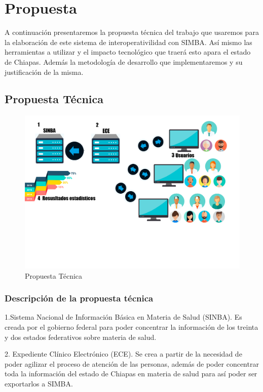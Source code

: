 \chapter{Propuesta} \label{sec:propuesta}

A continuación presentaremos la propuesta técnica del trabajo que usaremos para la elaboración de este sistema de interoperativilidad con SIMBA. Así mismo las herramientas a utilizar y el impacto tecnológico que traerá esto apara el estado de Chiapas. Además la metodología de desarrollo que implementaremos y su justificación de la misma.

\section{Propuesta Técnica}

\begin{figure}[h]
  \centering
  \includegraphics[scale=.1]{lib/assets/propuesta}
  \caption{Propuesta Técnica}
\end{figure}
\subsection{Descripción de la propuesta técnica}
1.Sistema Nacional de Información Básica en Materia de Salud (SINBA). Es creada por el gobierno federal para poder concentrar la información de los treinta y dos estados federativos sobre materia de salud.

2. Expediente Clínico Electrónico (ECE). Se crea a partir de la necesidad de poder agilizar el proceso de atención de las personas, además de poder concentrar toda la información del estado de Chiapas en materia de salud para así poder ser exportarlos a SIMBA.

